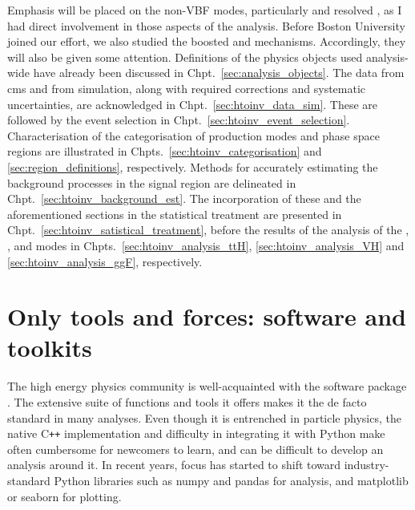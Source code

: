 Emphasis will be placed on the non-VBF modes, particularly \ttH and resolved \VH, as I had direct involvement in those aspects of the analysis. Before Boston University joined our effort, we also studied the boosted \VH and \ggF mechanisms. Accordingly, they will also be given some attention. Definitions of the physics objects used analysis-wide have already been discussed in Chpt.~\ref{sec:analysis_objects}. The data from \acrshort{cms} and from simulation, along with required corrections and systematic uncertainties, are acknowledged in Chpt.~\ref{sec:htoinv_data_sim}. These are followed by the event selection in Chpt.~\ref{sec:htoinv_event_selection}. Characterisation of the categorisation of production modes and phase space regions are illustrated in Chpts.~\ref{sec:htoinv_categorisation} and \ref{sec:region_definitions}, respectively. Methods for accurately estimating the background processes in the signal region are delineated in Chpt.~\ref{sec:htoinv_background_est}. The incorporation of these and the aforementioned sections in the statistical treatment are presented in Chpt.~\ref{sec:htoinv_satistical_treatment}, before the results of the analysis of the \ttH, \VH, and \ggF modes in Chpts.~\ref{sec:htoinv_analysis_ttH}, \ref{sec:htoinv_analysis_VH} and \ref{sec:htoinv_analysis_ggF}, respectively.





\section{Only tools and forces: software and toolkits}
\label{sec:htoinv_software}

The high energy physics community is well-acquainted with the software package \ROOT. The extensive suite of functions and tools it offers makes it the de facto standard in many analyses. Even though it is entrenched in particle physics, the native C\texttt{++} implementation and difficulty in integrating it with Python make \ROOT often cumbersome for newcomers to learn, and can be difficult to develop an analysis around it. In recent years, focus has started to shift toward industry-standard Python libraries such as \textsf{numpy} and \textsf{pandas} for analysis, and \textsf{matplotlib} or \textsf{seaborn} for plotting.

